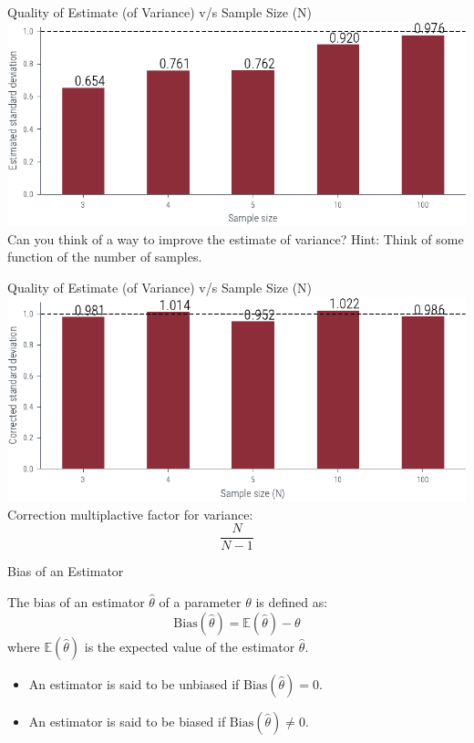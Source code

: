 \documentclass[handout]{beamer}
\begin{document}
\begin{frame}{Quality of Estimate (of Variance) v/s Sample Size (N)}
    \includegraphics[width=\textwidth]{../figures/biased-mle-variance-quality.pdf}
Can you think of a way to improve the estimate of variance? 
Hint: Think of some function of the number of samples.
\end{frame}

\begin{frame}{Quality of Estimate (of Variance) v/s Sample Size (N)}
    \includegraphics[width=\textwidth]{../figures/corrected-mle-variance-quality.pdf}
Correction multiplactive factor for variance:
\[
    \frac{N}{N-1}
\]
\end{frame}
    

\begin{frame}{Bias of an Estimator}
    \begin{tcolorbox}[colback=metropolisblue!5,colframe=metropolisblue,title=Bias of an Estimator]
        The bias of an estimator $\hat{\theta}$ of a parameter $\theta$ is defined as:
        \[
            \text{Bias}(\hat{\theta}) = \mathbb{E}(\hat{\theta}) - \theta
        \]
        where $\mathbb{E}(\hat{\theta})$ is the expected value of the estimator $\hat{\theta}$.
    \end{tcolorbox}
    \begin{itemize}
        \item An estimator is said to be unbiased if $\text{Bias}(\hat{\theta}) = 0$.
        \item An estimator is said to be biased if $\text{Bias}(\hat{\theta}) \neq 0$.
    \end{itemize}
    
\end{frame}
\end{document}
